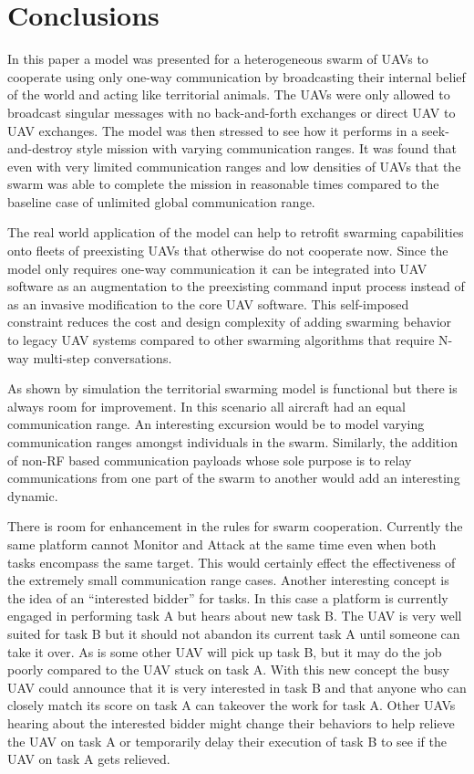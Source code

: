\chapter{Conclusions}
\label{chap:conclusion}

In this paper a model was presented for a heterogeneous swarm of UAVs to cooperate using only one-way communication by broadcasting their internal belief of the world and acting like territorial animals.  The UAVs were only allowed to broadcast singular messages with no back-and-forth exchanges or direct UAV to UAV exchanges.  The model was then stressed to see how it performs in a seek-and-destroy style mission with varying communication ranges.  It was found that even with very limited communication ranges and low densities of UAVs that the swarm was able to complete the mission in reasonable times compared to the baseline case of unlimited global communication range.

The real world application of the model can help to retrofit swarming capabilities onto fleets of preexisting UAVs that otherwise do not cooperate now.  Since the model only requires one-way communication it can be integrated into UAV software as an augmentation to the preexisting command input process instead of as an invasive modification to the core UAV software. This self-imposed constraint reduces the cost and design complexity of adding swarming behavior to legacy UAV systems compared to other swarming algorithms that require N-way multi-step conversations.

As shown by simulation the territorial swarming model is functional but there is always room for improvement.  In this scenario all aircraft had an equal communication range.  An interesting excursion would be to model varying communication ranges amongst individuals in the swarm.  Similarly, the addition of non-RF based communication payloads whose sole purpose is to relay communications from one part of the swarm to another would add an interesting dynamic.

There is room for enhancement in the rules for swarm cooperation.  Currently the same platform cannot Monitor and Attack at the same time even when both tasks encompass the same target.  This would certainly effect the effectiveness of the extremely small communication range cases.  Another interesting concept is the idea of an ``interested bidder'' for tasks.  In this case a platform is currently engaged in performing task A but hears about new task B.  The UAV is very well suited for task B but it should not abandon its current task A until someone can take it over.  As is some other UAV will pick up task B, but it may do the job poorly compared to the UAV stuck on task A.  With this new concept the busy UAV could announce that it is very interested in task B and that anyone who can closely match its score on task A can takeover the work for task A.  Other UAVs hearing about the interested bidder might change their behaviors to help relieve the UAV on task A or temporarily delay their execution of task B to see if the UAV on task A gets relieved.

